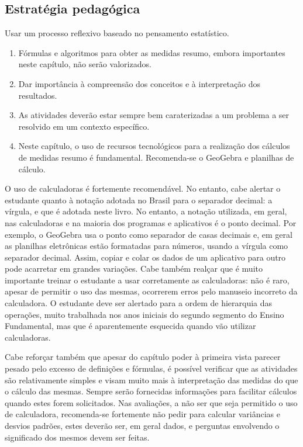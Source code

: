 \begin{apresentacao}
\section{Estratégia pedagógica}

Usar um processo reflexivo baseado no pensamento estatístico.

\begin{enumerate}
\item Fórmulas e algoritmos para obter as medidas resumo, embora importantes neste capítulo, não serão valorizados.
\item Dar importância à compreensão dos conceitos e à interpretação dos resultados.
\item As atividades deverão estar sempre bem caraterizadas a um problema a ser resolvido em um contexto específico.
\item Neste capítulo, o uso de recursos tecnológicos para a realização dos cálculos de medidas resumo é fundamental. Recomenda-se o GeoGebra e planilhas de cálculo.
\end{enumerate}

O uso de calculadoras é fortemente recomendável. No entanto, cabe alertar o estudante quanto à notação adotada no Brasil para o separador decimal: a vírgula, e que é adotada neste livro. No entanto, a notação utilizada, em geral, nas calculadoras e na maioria dos programas e aplicativos é o ponto decimal. Por exemplo, o GeoGebra usa o ponto como separador de casas decimais e, em geral as planilhas eletrônicas estão formatadas para números, usando a vírgula como separador decimal. Assim, copiar e colar os dados de um aplicativo para outro pode acarretar em grandes variações. Cabe também realçar que é muito importante treinar o estudante a usar corretamente as calculadoras: não é raro, apesar de permitir o uso das mesmas, ocorrerem erros pelo manuseio incorreto da calculadora. O estudante deve ser alertado para a ordem de hierarquia das operações, muito trabalhada nos anos iniciais do segundo segmento do Ensino Fundamental, mas que é aparentemente esquecida quando vão utilizar calculadoras.

Cabe reforçar também que apesar do capítulo poder à primeira vista parecer pesado pelo excesso de definições e fórmulas, é possível verificar que as atividades são relativamente simples e visam muito mais à interpretação das medidas do que o cálculo das mesmas. Sempre serão fornecidas informações para facilitar cálculos quando estes forem solicitados. Nas avaliações, a não ser que seja permitido o uso de calculadora, recomenda-se fortemente não pedir para calcular variâncias e desvios padrões, estes deverão ser, em geral dados, e perguntas envolvendo o significado dos mesmos devem ser feitas.


\end{apresentacao}
